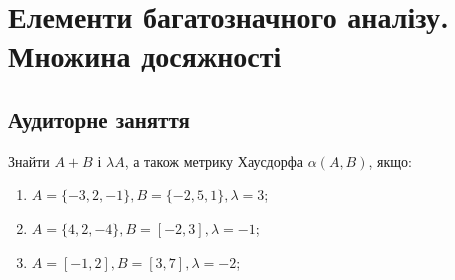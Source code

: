 
\section{Елементи багатозначного аналізу. Множина досяжності}

\subsection*{Аудиторне заняття}

\begin{problem}
	Знайти $A + B$ і $\lambda A$, а також метрику Хаусдорфа $\alpha (A, B)$, якщо:
	
	\begin{enumerate}
	    \item $A = \{-3, 2, -1\},  B = \{-2, 5, 1\},  \lambda = 3$;
	    
	    \item $A = \{4, 2, -4\},  B = [-2, 3],  \lambda = -1$;
	    
	    \item $A = [-1, 2],  B = [3, 7],  \lambda = -2$;
	    
	\end{enumerate}
	
\end{problem}

